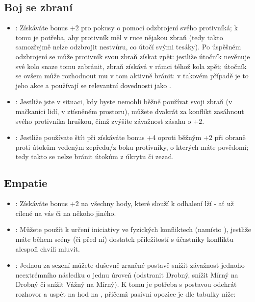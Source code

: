 \documentclass[../main.tex]{subfiles}
\begin{document}
\subsection{Boj se zbraní}
\label{sec:trik-bsz}
\begin{itemize}
\item{}:
  Získáváte bonus +2 pro pokusy o  pomocí odzbrojení svého protivníká; k tomu je potřeba, aby protivník měl v ruce nějakou zbraň (tedy takto samozřejmě nelze odzbrojit nestvůru, co útočí svými tesáky). Po úspěšném odzbrojení se může protivník svou zbraň získat zpět: jestliže útočník nevěnuje své kolo snaze tomu zabránit, zbraň získává v rámci téhož kola zpět; útočník se ovšem může rozhodnout mu v tom aktivně bránit: v takovém případě je to jeho akce a používají se relevantní dovednosti jako .

\item{}:
\label{sec:bsz-hruska}
Jestliže jste v situaci, kdy byste nemohli běžně používat svoji zbraň (v mačkanici lidí, v ztísněném prostoru), můžete dvakrát za konflikt zasáhnout svého protivníka hruškou, čímž zvýšíte závažnost zásahu o +2.

\item{}:
  \label{sec:bsz-stitar}
Jestliže používate štít při  získáváte bonus +4 oproti běžným +2 při obraně proti útokům vedeným zepředu/z boku protivníky, o kterých máte povědomí; tedy takto se nelze bránit útokům z úkrytu či zezad. 
\end{itemize}



\subsection{Empatie}
\label{sec:trik-empatie}

\begin{itemize}
\item{}:
\label{sec:empatie-odhalovani} Získáváte bonus +2 na všechny hody, které slouží k odhalení lží - ať už cílené na vás či na někoho jiného.

\item{}:
\label{sec:empatie-cit} Můžete použít  k určení iniciativy ve fyzických konfliktech (namísto ), jestliže máte během scény (či před ní) dostatek příležitostí s účastníky konfliktu alespoň chvíli mluvit.

\item{}:
\label{sec:empatie-terapuet} Jednou za sezení můžete duševně zraněné postavě snížit závažnost jednoho neextrémního následku o jednu úroveň (odstranit Drobný, snížit Mírný na Drobný či snížit Vážný na Mírný). K tomu je potřeba s postavou odehrát rozhovor a uspět na hod na , přičemž pasivní opozice je dle tabulky níže:
\end{itemize}
\end{document}
